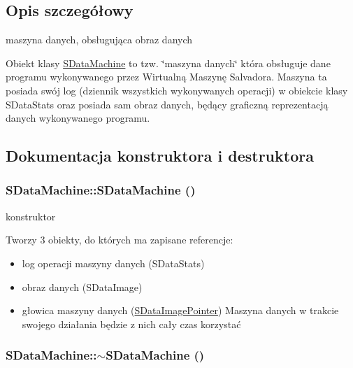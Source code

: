 \subsection{Opis szczegółowy}
maszyna danych, obsługująca obraz danych 

Obiekt klasy \hyperlink{classSDataMachine}{SDataMachine} to tzw. \char`\"{}maszyna danych\char`\"{} która obsługuje dane programu wykonywanego przez Wirtualną Maszynę Salvadora. Maszyna ta posiada swój log (dziennik wszystkich wykonywanych operacji) w obiekcie klasy SDataStats oraz posiada sam obraz danych, będący graficzną reprezentacją danych wykonywanego programu. 

\subsection{Dokumentacja konstruktora i destruktora}
\hypertarget{classSDataMachine_3d894df00bd2283c717a827e27138812}{
\subsubsection[{SDataMachine}]{\setlength{\rightskip}{0pt plus 5cm}SDataMachine::SDataMachine ()}}
\label{classSDataMachine_3d894df00bd2283c717a827e27138812}


konstruktor 

Tworzy 3 obiekty, do których ma zapisane referencje:\begin{itemize}
\item log operacji maszyny danych (SDataStats)\item obraz danych (SDataImage)\item głowica maszyny danych (\hyperlink{classSDataImagePointer}{SDataImagePointer}) Maszyna danych w trakcie swojego działania będzie z nich cały czas korzystać \end{itemize}
\hypertarget{classSDataMachine_59bc85b25930729cbe3046e81f49f909}{
\subsubsection[{$\sim$SDataMachine}]{\setlength{\rightskip}{0pt plus 5cm}SDataMachine::$\sim$SDataMachine ()}}
\label{classSDataMachine_59bc85b25930729cbe3046e81f49f909}


